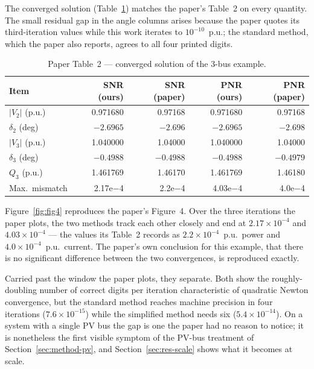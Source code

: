 \documentclass[sigconf,nonacm]{acmart}
\begin{document}
The converged solution (Table~\ref{tab:table2}) matches the paper's Table~2 on
every quantity. The small residual gap in the angle columns arises because the
paper quotes its third-iteration values while this work iterates to
$10^{-10}$~p.u.; the standard method, which the paper also reports, agrees to
all four printed digits.

\begin{table}[t]
\centering
\caption{Paper Table~2 --- converged solution of the 3-bus example.}
\label{tab:table2}
\small
\begin{tabular}{l r r r r}
\toprule
Item & SNR (ours) & SNR (paper) & PNR (ours) & PNR (paper) \\
\midrule
$|V_2|$ (p.u.)    & 0.971680  & 0.97168  & 0.971680  & 0.97168 \\
$\delta_2$ (deg)  & $-2.6965$ & $-2.696$ & $-2.6965$ & $-2.698$ \\
$|V_3|$ (p.u.)    & 1.040000  & 1.04000  & 1.040000  & 1.04000 \\
$\delta_3$ (deg)  & $-0.4988$ & $-0.4988$& $-0.4988$ & $-0.4979$ \\
$Q_3$ (p.u.)      & 1.461769  & 1.46170  & 1.461769  & 1.46180 \\
Max.\ mismatch    & 2.17e$-$4 & 2.2e$-$4 & 4.03e$-$4 & 4.0e$-$4 \\
\bottomrule
\end{tabular}
\end{table}

Figure~\ref{fig:fig4} reproduces the paper's Figure~4. Over the three iterations
the paper plots, the two methods track each other closely and end at
$2.17\times10^{-4}$ and $4.03\times10^{-4}$ --- the values its Table~2 records as
$2.2\times10^{-4}$~p.u.\ power and $4.0\times10^{-4}$~p.u.\ current. The paper's
own conclusion for this example, that there is no significant difference between
the two convergences, is reproduced exactly.

Carried past the window the paper plots, they separate. Both show the
roughly-doubling number of correct digits per iteration characteristic of
quadratic Newton convergence, but the standard method reaches machine precision
in four iterations ($7.6\times10^{-15}$) while the simplified method needs six
($5.4\times10^{-14}$). On a system with a single PV bus the gap is one the paper
had no reason to notice; it is nonetheless the first visible symptom of the
PV-bus treatment of Section~\ref{sec:method-pv}, and
Section~\ref{sec:res-scale} shows what it becomes at scale.
\end{document}
